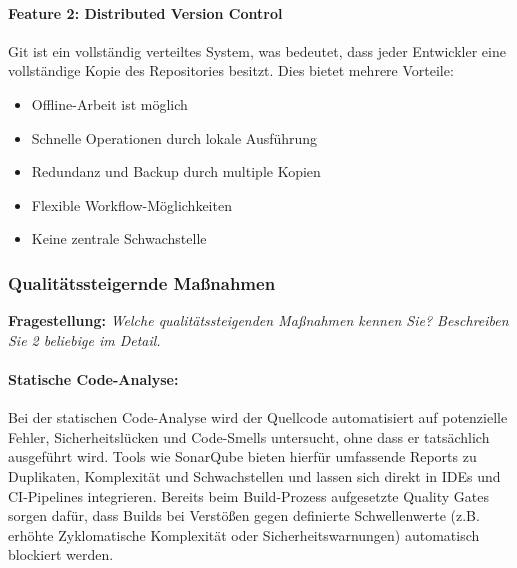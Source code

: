     \paragraph{Feature 2: Distributed Version Control}
    Git ist ein vollständig verteiltes System, was bedeutet, dass jeder Entwickler eine vollständige Kopie des Repositories besitzt.
    Dies bietet mehrere Vorteile:

    \begin{itemize}
        \item Offline-Arbeit ist möglich
        \item Schnelle Operationen durch lokale Ausführung
        \item Redundanz und Backup durch multiple Kopien
        \item Flexible Workflow-Möglichkeiten
        \item Keine zentrale Schwachstelle
    \end{itemize}






\subsubsection{Qualitätssteigernde Maßnahmen}

\textbf{Fragestellung:} \textit{Welche qualitätssteigenden Maßnahmen kennen Sie? Beschreiben Sie 2 beliebige im Detail.}    


\paragraph{Statische Code-Analyse:}
Bei der statischen Code-Analyse wird der Quellcode automatisiert auf potenzielle Fehler, Sicherheitslücken und Code-Smells untersucht,
ohne dass er tatsächlich ausgeführt wird. Tools wie SonarQube bieten hierfür umfassende Reports zu Duplikaten, Komplexität und
Schwachstellen und lassen sich direkt in IDEs und CI-Pipelines integrieren. \cite{sonarqube-docs-2023,ayewah2008using}
Bereits beim Build-Prozess aufgesetzte Quality Gates sorgen dafür, dass Builds bei Verstößen gegen definierte Schwellenwerte
(z.B. erhöhte Zyklomatische Komplexität oder Sicherheitswarnungen) automatisch blockiert werden. \cite{beller2016static} \\

